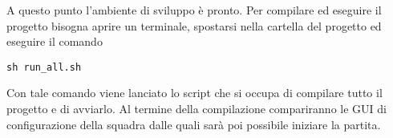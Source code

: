 \noindent A questo punto l'ambiente di sviluppo \`{e} pronto. Per compilare ed eseguire il progetto bisogna aprire un terminale, spostarsi nella cartella del progetto ed eseguire il comando\\

\begin{center}
	\verb+sh run_all.sh+\\
\end{center}

Con tale comando viene lanciato lo script che si occupa di compilare tutto il progetto e di avviarlo. Al termine della compilazione compariranno le GUI di configurazione della squadra dalle quali sar\`{a} poi possibile iniziare la partita.